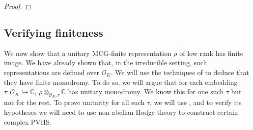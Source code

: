 \documentclass[12 pt]{amsart}
\theoremstyle{plain}
\theoremstyle{definition}
\theoremstyle{remark}
\numberwithin{equation}{section}
\begin{document}
\begin{proof}
%
\end{proof}

\subsection{Verifying finiteness}
\label{subsection:finiteness}
We now show that a unitary MCG-finite representation $\rho$ of low rank has finite image. We have already shown that, in the irreducible setting, such representations are defined over $\mathscr{O}_K$. We will use the techniques of \cite{LL:geometric-local-systems} to deduce that they have finite monodromy. To do so, we will argue that for each embedding $\tau: \mathscr{O}_K\hookrightarrow\mathbb{C}$, $\rho\otimes_{\mathscr{O}_K, \tau}\mathbb{C}$ has unitary monodromy. We know this for one such $\tau$ but not for the rest.  
To prove unitarity for all such $\tau$, we will use \cite[Theorem
1.2.12]{LL:geometric-local-systems}, and to verify its hypotheses we will need
to use non-abelian Hodge theory to construct certain complex PVHS.
\end{document}
